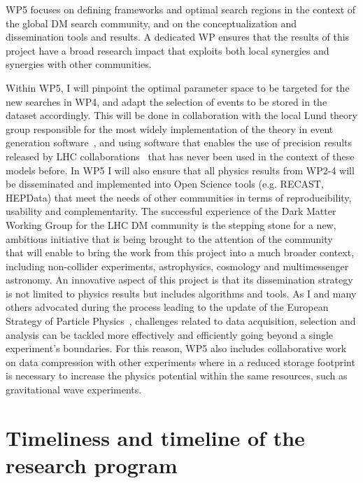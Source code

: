 \documentclass[11pt,a4paper]{article}
\begin{document}
WP5 focuses on defining frameworks and optimal search regions in the context of the global DM search community, and on the conceptualization and dissemination tools and results.
A dedicated WP ensures that the results of this project have a broad research impact that exploits both local synergies and synergies with other communities. 

Within WP5, I will pinpoint the optimal parameter space to be targeted for the new searches in WP4, and adapt the selection of events to be stored in the dataset accordingly. This will be done in collaboration with the local Lund theory group responsible for the most widely implementation of the theory in event generation software~\cite{HiddenValleyPytia}, and using software that enables the use of precision results released by LHC collaborations~\cite{CONTUR} that has never been used in the context of these models before. 
In WP5 I will also ensure that all physics results from WP2-4 will be disseminated and implemented into Open Science tools (e.g. RECAST, HEPData) that meet the needs of other communities in terms of reproducibility, usability and complementarity. The successful experience of the Dark Matter Working Group for the LHC DM community is the stepping stone for a new, ambitious initiative that is being brought to the attention of the community~\cite{iDMEU} that will enable to bring the work from this project into a much broader context, including non-collider experiments, astrophysics, cosmology and multimessenger astronomy. 
An innovative aspect of this project is that its dissemination strategy is not limited to physics results but includes algorithms and tools. 
As I and many others advocated during the process leading to the update of the European Strategy of Particle Physics~\cite{EPSProceedings}, challenges related to data acquisition, selection and analysis can be tackled more effectively and efficiently going beyond a single experiment's boundaries. 
For this reason, WP5 also includes collaborative work on data compression with other experiments where in a reduced storage footprint is necessary to increase the physics potential within the same resources, such as gravitational wave experiments. 

\section{Timeliness and timeline of the research program} 
\smallskip
\end{document}
